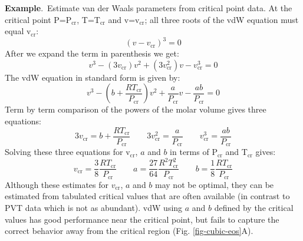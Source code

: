 \documentclass[11pt]{article}
\theoremstyle{definition}
\begin{document}
\begin{mdframed}[backgroundcolor=lgray]
\noindent\textbf{Example}.~Estimate van der Waals parameters from critical point data.
At the critical point P=P$_{\mathrm{cr}}$, T=T$_{\mathrm{cr}}$ and v=v$_{\mathrm{cr}}$;
all three roots of the vdW equation must equal v$_{\mathrm{cr}}$:
\begin{equation}
  \left(v-v_{\mathrm{cr}}\right)^3 = 0
\end{equation}
After we expand the term in parenthesis we get:
\begin{equation}
v^3-\left(3v_{\mathrm{cr}}\right)v^2+\left(3v^{2}_{\mathrm{cr}}\right)v-v^{3}_{\mathrm{cr}} = 0
\end{equation}
The vdW equation in standard form is given by:
\begin{equation}
  v^3-\left(b+\frac{RT_{\mathrm{cr}}}{P_{\mathrm{cr}}}\right)v^2+\frac{a}{P_{\mathrm{cr}}}v-\frac{ab}{P_{\mathrm{cr}}} = 0
\end{equation}
Term by term comparison of the powers of the molar volume gives three equations:
\begin{equation}
  3v_{\mathrm{cr}} = b+\frac{RT_{\mathrm{cr}}}{P_{\mathrm{cr}}}\qquad
  3v^{2}_{\mathrm{cr}} = \frac{a}{P_{\mathrm{cr}}}\qquad
  v^{3}_{\mathrm{cr}} = \frac{ab}{P_{\mathrm{cr}}}
\end{equation}
Solving these three equations for v$_{\mathrm{cr}}$, $a$ and $b$ in terms of P$_{\mathrm{cr}}$ and T$_{\mathrm{cr}}$ gives:
\begin{equation}
  v_{\mathrm{cr}} = \frac{3}{8}\frac{RT_{\mathrm{cr}}}{P_{\mathrm{\mathrm{cr}}}}\qquad
  a = \frac{27}{64}\frac{R^{2}T^{2}_{\mathrm{cr}}}{P_{\mathrm{cr}}}\qquad
  b = \frac{1}{8}\frac{RT_{\mathrm{cr}}}{P_{\mathrm{cr}}}
\end{equation}
Although these estimates for $v_{\mathrm{cr}}$, $a$ and $b$ may not be optimal, they can be estimated from
tabulated critical values that are often available (in contrast to PVT data which is not as abundant).
vdW using $a$ and $b$ defined by the critical values has good performance near the critical point, but
fails to capture the correct behavior away from the critical region (Fig. \ref{fig-cubic-eos}A).
\end{mdframed}

\end{document}
